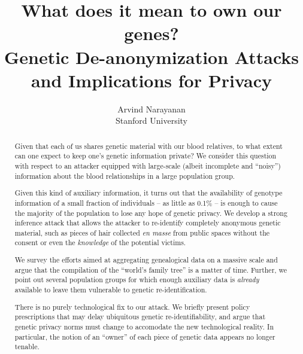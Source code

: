 \documentclass{article}
\title{What does it mean to own our genes?\\
{\small Genetic De-anonymization Attacks and Implications for Privacy}}
\author{Arvind Narayanan \\
{\small Stanford University}}
\begin{document}
\maketitle


\begin{abstract}
Given that each of us shares genetic material with our blood relatives, to what extent can one expect to keep one's genetic information private? We consider this question with respect to an attacker equipped with large-scale (albeit incomplete and ``noisy'') information about the blood relationships in a large population group. 

Given this kind of auxiliary information, it turns out that the availability of genotype information of a small fraction of individuals -- as little as 0.1\% -- is enough to cause the majority of the population to lose any hope of genetic privacy. We develop a strong inference attack that allows the attacker to re-identify completely anonymous genetic material, such as pieces of hair collected {\em en masse} from public spaces without the consent or even the {\em knowledge} of the potential victims.

We survey the efforts aimed at aggregating genealogical  data on a massive scale and argue that the compilation of the ``world's family tree'' is a matter of time. Further, we point out several population groups for which enough auxiliary data is {\em already} available to leave them vulnerable to genetic re-identification.

There is no purely technological fix to our attack. We briefly present policy prescriptions that may delay ubiquitous genetic re-identifiability, and argue that genetic privacy norms must change to accomodate the new technological reality. In particular, the notion of an ``owner'' of each piece of genetic data appears no longer tenable.
 



\end{abstract}
\end{document}
